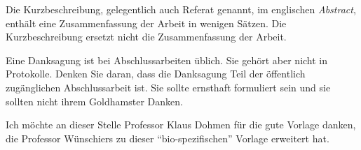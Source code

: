 \documentclass[nomenclature, norefpage, oneside, glossary, hypertext,multiauthor]{hsmw-class}
\begin{document}





\begin{Kurzbeschreibung}
Die Kurzbeschreibung, gelegentlich auch Referat genannt, im englischen \textit{Abstract}, enthält eine Zusammenfassung der Arbeit in wenigen Sätzen. Die Kurzbeschreibung ersetzt nicht die Zusammenfassung der Arbeit.
\end{Kurzbeschreibung}


\begin{Danksagung}
Eine Danksagung ist bei Abschlussarbeiten üblich. Sie gehört aber nicht in Protokolle. Denken Sie daran, dass die Danksagung Teil der öffentlich zugänglichen Abschlussarbeit ist. Sie sollte ernsthaft formuliert sein und sie sollten nicht ihrem Goldhamster Danken.

Ich möchte an dieser Stelle Professor Klaus Dohmen für die gute Vorlage danken, die Professor Wünschiers zu dieser \enquote{bio-spezifischen} Vorlage erweitert hat.
\end{Danksagung}


\Hauptteil %


\end{document}

